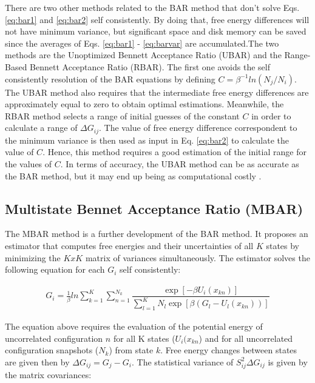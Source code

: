 There are two other methods related to the BAR method that don't solve Eqs. \eqref{eq:bar1} and \eqref{eq:bar2} self consistently. By doing that, free energy differences will not have minimum variance, but significant space and disk memory can be saved since the averages of Eqs. \eqref{eq:bar1} - \eqref{eq:barvar} are accumulated.The two methods are the Unoptimized Bennett Acceptance Ratio (UBAR) and the Range-Based Bennett Acceptance Ratio (RBAR). The first one avoids the self consistently resolution of the BAR equations by defining $C=\beta^{-1}ln(N_{j}/N_{i})$. The UBAR method also requires that the intermediate free energy differences are approximately equal to zero to obtain optimal estimations. Meanwhile, the RBAR method selects a range of initial guesses of the constant $C$ in order to calculate a range  of $\Delta G_{ij}$. The value of free energy difference correspondent to the minimum variance is then used as input in Eq. \eqref{eq:bar2} to calculate the value of $C$. Hence, this method requires a good estimation of the initial range for the values of $C$. In terms of accuracy, the UBAR method can be as accurate as the BAR method, but it may end up being as computational costly \cite{bareva}.  

\subsection{Multistate Bennet Acceptance Ratio (MBAR)}\label{mbar}

The MBAR method \cite{mbar} is a further development of the BAR method. It proposes an estimator that computes free energies and their uncertainties of all $K$ states  by minimizing the $KxK$ matrix of variances simultaneously. The estimator solves the following equation for each $G_{i}$ self consistently:

\begin{equation}
\label{eq:mbar}
\begin{aligned}
G_{i} = \frac{1}{\beta}ln \sum_{k=1}^{K} \sum_{n=1}^{N_{k}}
\dfrac{\exp[-\beta U_{i}(x_{kn})]}{\sum_{l=1}^{K} N_{l} \exp[\beta (G_{l} - U_{l}(x_{kn}))]}
\end{aligned}
\end{equation}

The equation above requires the evaluation of the potential energy  of uncorrelated configuration $n$ for all K states ($U_{i}(x_{kn}$) and for all uncorrelated configuration snapshots ($N_{k}$) from state $k$. Free energy changes between states are given then by $\Delta G_{ij} = G_{j} -  G_{i}$. The statistical variance of $S_{ij}^{2} \Delta G_{ij}$ is given by the matrix covariances:

